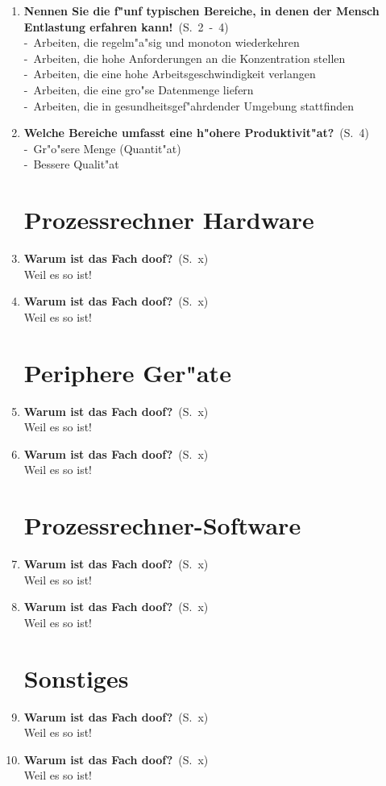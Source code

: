 \documentclass[a4paper,latin1,12pt]{article}
\newcommand{\question}[3]{\pagebreak[3]\item {\textbf{#1?}}\ (S.\ #2)#3}
\newcommand{\statement}[3]{\pagebreak[3]\item {\textbf{#1!}}\ (S.\ #2)#3}
\newcommand{\catchword}[1]{\\-\ #1}
\newcommand{\normaltext}[1]{\\#1}
\newcommand{\page}[1]{#1}
\newcommand{\pages}[2]{#1\ -\ #2}
\begin{document}
\begin{enumerate}
  \statement{Nennen Sie die f"unf typischen Bereiche,
             in denen der Mensch Entlastung erfahren kann}{\pages{2}{4}}
  {
    \catchword{Arbeiten, die regelm"a"sig und monoton wiederkehren}
    \catchword{Arbeiten, die hohe Anforderungen an die Konzentration stellen}
    \catchword{Arbeiten, die eine hohe Arbeitsgeschwindigkeit verlangen}
    \catchword{Arbeiten, die eine gro"se Datenmenge liefern}
    \catchword{Arbeiten, die in gesundheitsgef"ahrdender Umgebung stattfinden}
  }

  \question{Welche Bereiche umfasst eine h"ohere Produktivit"at}{\page{4}}
  {
    \catchword{Gr"o"sere Menge (Quantit"at)}
    \catchword{Bessere Qualit"at}
  }

  \newpage
  \section{Prozessrechner Hardware}

  \question{Warum ist das Fach doof}{\page{x}}
  {
    \normaltext{Weil es so ist!}
  }

  \question{Warum ist das Fach doof}{\page{x}}
  {
    \normaltext{Weil es so ist!}
  }

  \newpage
  \section{Periphere Ger"ate}

  \question{Warum ist das Fach doof}{\page{x}}
  {
    \normaltext{Weil es so ist!}
  }

  \question{Warum ist das Fach doof}{\page{x}}
  {
    \normaltext{Weil es so ist!}
  }

  \newpage
  \section{Prozessrechner-Software}

  \question{Warum ist das Fach doof}{\page{x}}
  {
    \normaltext{Weil es so ist!}
  }

  \question{Warum ist das Fach doof}{\page{x}}
  {
    \normaltext{Weil es so ist!}
  }

  \newpage
  \section{Sonstiges}

  \question{Warum ist das Fach doof}{\page{x}}
  {
    \normaltext{Weil es so ist!}
  }

  \question{Warum ist das Fach doof}{\page{x}}
  {
    \normaltext{Weil es so ist!}
  }

\end{enumerate}
\end{document}
